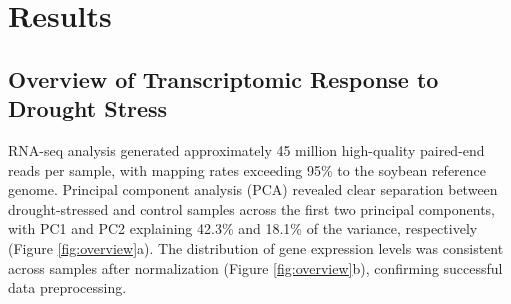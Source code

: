 \documentclass[11pt,a4paper]{article}
\begin{document}
\section{Results}

\subsection{Overview of Transcriptomic Response to Drought Stress}

RNA-seq analysis generated approximately 45 million high-quality paired-end reads per sample, with mapping rates exceeding 95\% to the soybean reference genome. Principal component analysis (PCA) revealed clear separation between drought-stressed and control samples across the first two principal components, with PC1 and PC2 explaining 42.3\% and 18.1\% of the variance, respectively (Figure \ref{fig:overview}a). The distribution of gene expression levels was consistent across samples after normalization (Figure \ref{fig:overview}b), confirming successful data preprocessing.
\end{document}
